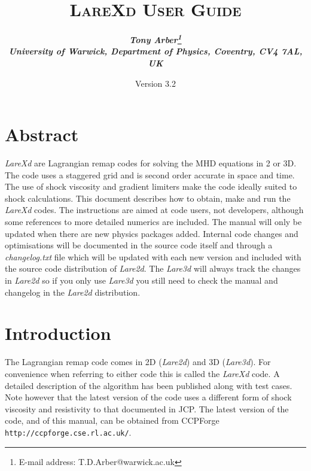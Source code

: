 \documentclass[11pt]{article}
\begin{document}
\title{
\bfseries\scshape LareXd User Guide}
\author{\bfseries\itshape Tony Arber\thanks{E-mail address: T.D.Arber@warwick.ac.uk}\\
University of Warwick, Department of Physics, Coventry, CV4 7AL, UK}
\date{Version 3.2}
\maketitle

\thispagestyle{empty}

\section*{Abstract}
{\it LareXd} are Lagrangian remap codes for solving the MHD equations in 2 or 3D. The code uses a staggered grid and is second order accurate in space and time. The use of shock viscosity and gradient limiters make the code ideally suited to shock calculations. This document describes how to obtain, make and run the {\it LareXd}  codes. The instructions are aimed at code users, not developers, although some references to more detailed numerics are included. The manual will only be
updated when there are new physics packages added. Internal code changes and optimisations will be documented in the source code itself and through a {\it changelog.txt} file which will be updated with each new version and included with the source code distribution of {\it Lare2d}. The {\it Lare3d} will always track the changes in {\it Lare2d} so if you only use {\it Lare3d} you still need to check the manual and changelog in the {\it Lare2d} distribution.


\section{Introduction}
The Lagrangian remap code comes in 2D ({\it Lare2d}) and 3D ({\it Lare3d}). For convenience when referring to either code this is called the {\it LareXd} code. A detailed description of the algorithm has been published \cite{jcp} along with test cases. Note however that the latest version of the code uses a different form of shock viscosity and resistivity to that documented in JCP. The latest version of the code, and of this manual, can be obtained from CCPForge {\tt http://ccpforge.cse.rl.ac.uk/}.
\end{document}
